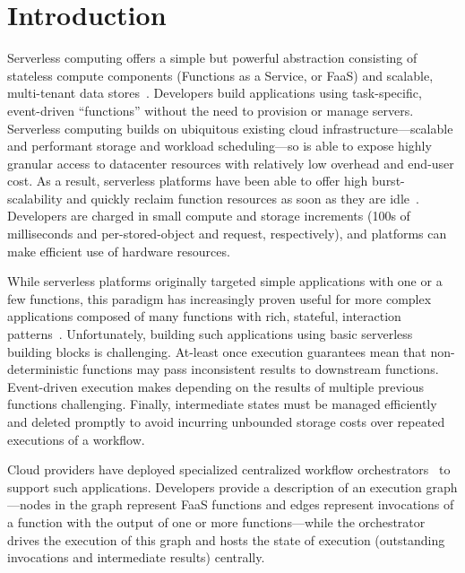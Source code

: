 \section{Introduction}\label{sec:intro}

Serverless computing offers a simple but powerful abstraction consisting of
stateless compute components (Functions as a Service, or FaaS) and scalable,
multi-tenant data stores~\cite{berkeley}. Developers build applications using
task-specific, event-driven ``functions'' without the need to provision or
manage servers.
Serverless computing builds on ubiquitous existing cloud
infrastructure---scalable and performant storage and workload scheduling---so is
able to expose highly granular access to datacenter resources with relatively
low overhead and end-user cost.
%
As a result, serverless platforms have been able to offer high burst-scalability
and quickly reclaim function resources as soon as they are
idle~\cite{aws-lambda,gcp-functions,azure-functions,openwhisk,openfaas}.
Developers are charged in small compute and storage increments (100s of
milliseconds and per-stored-object and request, respectively), and platforms can
make efficient use of hardware resources.

While serverless platforms originally targeted simple applications with one or a
few functions, this paradigm has increasingly proven useful for more complex
applications composed of many functions with rich, stateful, interaction
patterns~\cite{excamera, pywren, gg-atc, beldi, boki}. Unfortunately, building
such applications using basic serverless building blocks is challenging.
At-least once execution guarantees mean that non-deterministic functions may
pass inconsistent results to downstream functions. Event-driven execution makes
depending on the results of multiple previous functions challenging. Finally,
intermediate states must be managed efficiently and deleted promptly to avoid
incurring unbounded storage costs over repeated executions of a workflow.

Cloud providers have deployed specialized centralized workflow
orchestrators~\cite{aws-step-functions, google-cloud-composer, google-workflows,
durable-functions} to support such applications. Developers provide a
description of an execution graph---nodes in the graph represent FaaS functions
and edges represent invocations of a function with the output of one or more
functions---while the orchestrator drives the execution of this graph and hosts
the state of execution (outstanding invocations and intermediate results)
centrally.

